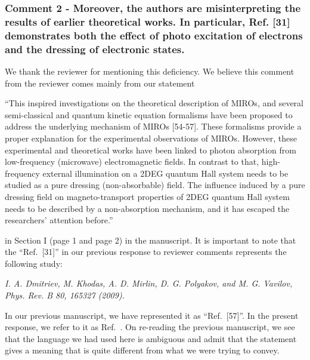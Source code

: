 \documentclass{article}
\begin{document}
\subsubsection*{Comment 2 -
\color{RoyalBlue} Moreover, the authors are misinterpreting the results of earlier theoretical works. In particular, Ref. [31] demonstrates both the effect of photo excitation of electrons and the dressing of electronic states.}

We thank the reviewer for mentioning this deficiency. We believe this comment from the reviewer comes mainly from our statement

“This inspired investigations on the theoretical description of MIROs, and several semi-classical and quantum kinetic equation formalisms have been proposed to address the underlying mechanism of MIROs [54-57]. These formalisms provide a proper explanation for the experimental observations of MIROs. However, these experimental and theoretical works have been linked to photon absorption from low-frequency (microwave) electromagnetic fields.
In contrast to that, high-frequency external illumination on a 2DEG quantum Hall system needs to be studied as a pure dressing (non-absorbable) field.
The influence induced by a pure dressing field on
magneto-transport properties of 2DEG quantum Hall system needs to be described by a non-absorption mechanism, and it has escaped the researchers’ attention before.”

in Section I (page 1 and page 2) in the manuscript. It is important to note that the ``Ref.~[31]'' in our previous response to reviewer comments represents the following study:

\textit{I. A. Dmitriev, M. Khodas, A. D. Mirlin, D. G. Polyakov, and M. G. Vavilov, Phys. Rev. B 80, 165327 (2009).}

In our previous manuscript, we have represented it as ``Ref.~[57]''. In the present response, we refer to it as Ref.~\cite{dmitriev09}.
On re-reading the previous manuscript, we see that the language we had used here is ambiguous and admit that the statement gives a meaning that is quite different from what we were trying to convey.
\end{document}
